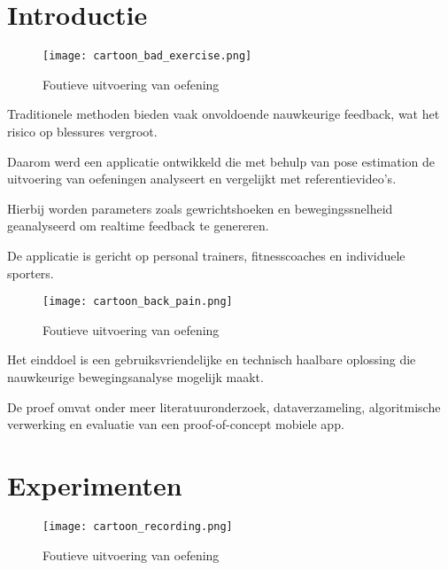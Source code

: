 \documentclass[a0,portrait]{hogent-poster}
\begin{document}
\begin{multicols}{2} %

\section{Introductie}

\begin{figure}[H]
  \centering
  \texttt{[image: cartoon\_bad\_exercise.png]}
  \caption*{Foutieve uitvoering van oefening}
  \vspace{1em}
\end{figure}

Traditionele methoden bieden vaak onvoldoende nauwkeurige feedback, wat het risico op blessures vergroot. 

Daarom werd een applicatie ontwikkeld die met behulp van pose estimation de uitvoering van oefeningen analyseert en vergelijkt met referentievideo’s. 

Hierbij worden parameters zoals gewrichtshoeken en bewegingssnelheid geanalyseerd om realtime feedback te genereren. 

De applicatie is gericht op personal trainers, fitnesscoaches en individuele sporters. 

\vspace{1em}

\begin{figure}[H]
  \centering
  \texttt{[image: cartoon\_back\_pain.png]}
  \caption*{Foutieve uitvoering van oefening}
  \vspace{1em}
\end{figure}

Het einddoel is een gebruiksvriendelijke en technisch haalbare oplossing die nauwkeurige bewegingsanalyse mogelijk maakt. 

De proef omvat onder meer literatuuronderzoek, dataverzameling, algoritmische verwerking en evaluatie van een proof-of-concept mobiele app.

\section{Experimenten}

\begin{figure}[H]
  \centering
  \texttt{[image: cartoon\_recording.png]}
  \caption*{Foutieve uitvoering van oefening}
  \vspace{1em}
\end{figure}


\end{multicols}
\end{document}
